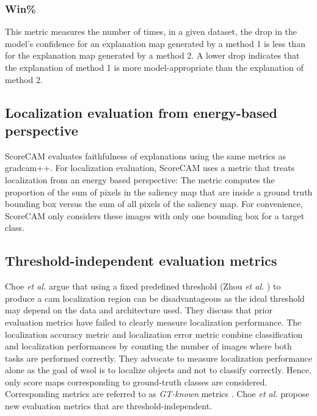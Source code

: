 \subsubsection{Win\%}
This metric measures the number of times, in a given dataset, the drop in the model's confidence for an explanation map generated by a method 1 is less than for the explanation map generated by a method 2. A lower drop indicates that the explanation of method 1 is more model-appropriate than the explanation of method 2.

\subsection{Localization evaluation from energy-based perspective}
ScoreCAM evaluates faithfulness of explanations using the same metrics as \acrshort{gradcam}++. For localization evaluation, ScoreCAM uses a metric that treats localization from an energy based perspective: The metric computes the proportion of the sum of pixels in the saliency map that are inside a ground truth bounding box versus the sum of all pixels of the saliency map. For convenience, ScoreCAM only considers these images with only one bounding box for a target class.

\subsection{Threshold-independent evaluation metrics}
Choe \textit{et al.} \cite{choe2020evaluating} argue that using a fixed predefined threshold (Zhou \textit{et al.} \cite{zhou2016cvpr}) to produce a \acrshort{cam} localization region can be disadvantageous as the ideal threshold may depend on the data and architecture used. They discuss that prior evaluation metrics have failed to clearly measure localization performance. The localization accuracy metric \cite{russakovsky2015imagenet} and localization error \cite{zhou2016cvpr, selvaraju2017grad} metric combine classification and localization performances by counting the number of images where both tasks are performed correctly. They advocate to measure localization performance alone as the goal of \acrshort{wsol} is to localize objects and not to classify correctly. Hence, only score maps corresponding to ground-truth classes are considered. Corresponding metrics are referred to as \textit{GT-known} metrics \cite{choe2019attention, singh2017hide, zhang2018adversarial, zhang2018self}. Choe \textit{et al.} propose new evaluation metrics that are threshold-independent.

